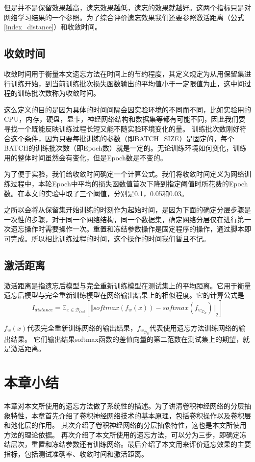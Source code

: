 但是并不是保留效果越高，遗忘效果越低，遗忘的效果就越好。这两个指标只是对网络学习结果的一个参照。为了综合评价遗忘效果我们还要参照激活距离（公式\ref{index_distance}）和收敛时间。

\subsection{收敛时间}

收敛时间用于衡量本文遗忘方法在时间上的节约程度，其定义规定为从用保留集进行训练开始，到当前训练批次损失函数输出的平均值小于一定限值为止，这中间过程的训练批次数称为收敛时间。

这么定义的目的是因为具体的时间间隔会因实验环境的不同而不同，比如实验用的CPU，内存，硬盘，显卡，神经网络结构和数据集等都有可能不同，因此我们要寻找一个既能反映训练过程长短又能不随实验环境变化的量。
训练批次数刚好符合这个条件，因为只要每批训练的参数（即BATCH\_SIZE）是固定的，每个BATCH的训练批次数（即Epoch数）就是一定的。无论训练环境如何变化，训练用的整体时间虽然会有变化，但是Epoch数是不变的。

为了便于实验，我们给收敛时间确定一个计算公式。我们将收敛时间定义为网络训练过程中，本轮Epoch中平均的损失函数值首次下降到指定阈值时所花费的Epoch数。在本文的实验中取了三个阈值，分别是0.1，0.05和0.03。

之所以会将从保留集开始训练的时刻作为起始时间，是因为下面的确定分层步骤是一次性的步骤，对于同一个网络结构，同一个数据集，确定网络分层仅在进行第一次遗忘操作时需要操作一次。重置和冻结参数操作是固定程序的操作，通过脚本即可完成。所以相比训练过程的时间，这个操作的时间我们暂且不记。

\subsection{激活距离}

激活距离是指遗忘后模型与完全重新训练模型在测试集上的平均距离。它用于衡量遗忘后模型与完全重新训练模型在网络输出结果上的相似程度。它的计算公式是
\begin{equation}
I_{distance} = {\mathbb{E}}_{x\in {\mathcal{D}_{test}}}[{\Vert softmax(f_w(x)) - softmax(f_{w_{\mathcal{D}_R}}) \Vert}_2 ] \label{index_distance}
\end{equation}

$f_w(x)$代表完全重新训练网络的输出结果，$f_{w_{\mathcal{D}_R}}$代表使用遗忘方法训练网络的输出结果。
它们输出结果softmax函数的差值向量的第二范数在测试集上的期望，就是激活距离。


\section{本章小结}
本章对本文所使用的遗忘方法做了系统性的描述。为了讲清卷积神经网络的分层抽象特性，本章首先介绍了卷积神经网络技术的基本原理，包括卷积操作以及卷积层和池化层的作用。
其次介绍了卷积神经网络的分层抽象特性，这也是本文所使用方法的理论依据。
再次介绍了本文所使用的遗忘方法，可以分为三步，即确定冻结层次，重置和冻结参数还有训练网络。最后介绍了本文用来评价遗忘效果的主要指标，包括测试准确率、收敛时间和激活距离。
